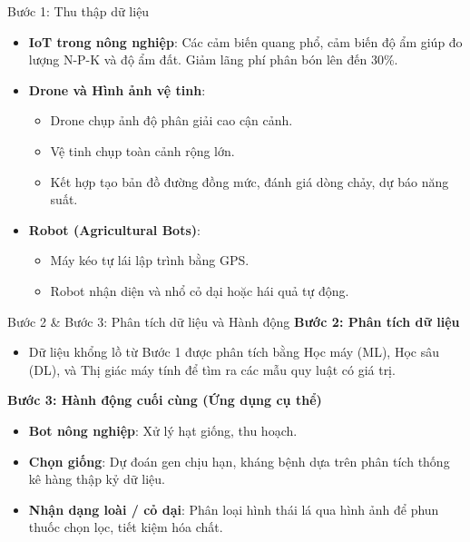 \documentclass[aspectratio=169]{beamer}
\begin{document}
\begin{frame}{Bước 1: Thu thập dữ liệu}
    \begin{itemize}
        \item \textbf{IoT trong nông nghiệp}: Các cảm biến quang phổ, cảm biến độ ẩm giúp đo lượng N-P-K và độ ẩm đất. Giảm lãng phí phân bón lên đến 30\%.
        \item \textbf{Drone và Hình ảnh vệ tinh}: 
        \begin{itemize}
            \item Drone chụp ảnh độ phân giải cao cận cảnh.
            \item Vệ tinh chụp toàn cảnh rộng lớn.
            \item Kết hợp tạo bản đồ đường đồng mức, đánh giá dòng chảy, dự báo năng suất.
        \end{itemize}
        \item \textbf{Robot (Agricultural Bots)}: 
        \begin{itemize}
            \item Máy kéo tự lái lập trình bằng GPS.
            \item Robot nhận diện và nhổ cỏ dại hoặc hái quả tự động.
        \end{itemize}
    \end{itemize}
\end{frame}

\begin{frame}{Bước 2 \& Bước 3: Phân tích dữ liệu và Hành động}
    \textbf{Bước 2: Phân tích dữ liệu}
    \begin{itemize}
        \item Dữ liệu khổng lồ từ Bước 1 được phân tích bằng Học máy (ML), Học sâu (DL), và Thị giác máy tính để tìm ra các mẫu quy luật có giá trị.
    \end{itemize}
    \vspace{0.3cm}
    \textbf{Bước 3: Hành động cuối cùng (Ứng dụng cụ thể)}
    \begin{itemize}
        \item \textbf{Bot nông nghiệp}: Xử lý hạt giống, thu hoạch.
        \item \textbf{Chọn giống}: Dự đoán gen chịu hạn, kháng bệnh dựa trên phân tích thống kê hàng thập kỷ dữ liệu.
        \item \textbf{Nhận dạng loài / cỏ dại}: Phân loại hình thái lá qua hình ảnh để phun thuốc chọn lọc, tiết kiệm hóa chất.
    \end{itemize}
\end{frame}
\end{document}

